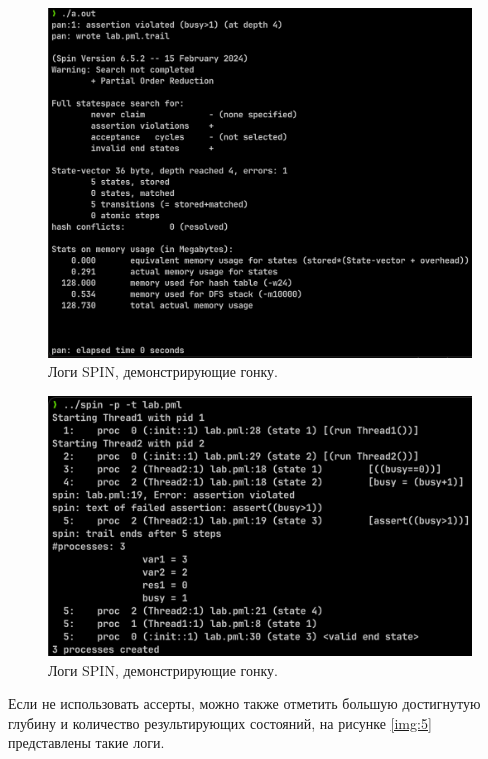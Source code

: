 \begin{figure}[H]
	\centering
	\includegraphics[width=\textwidth]{inc/2.png}
	\caption{ Логи SPIN, демонстрирующие гонку. }
	\label{img:2}
\end{figure}

\begin{figure}[H]
	\centering
	\includegraphics[width=\textwidth]{inc/3.png}
	\caption{ Логи SPIN, демонстрирующие гонку. }
	\label{img:3}
\end{figure}

Если не использовать ассерты, можно также отметить большую достигнутую глубину и количество результирующих состояний, на рисунке \ref{img:5} представлены такие логи.

